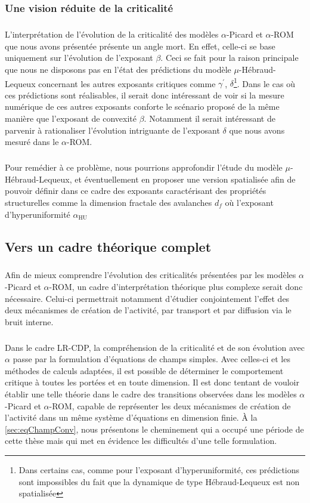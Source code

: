 \subsubsection{Une vision réduite de la criticalité}

\subparagraph{}L'interprétation de l'évolution de la criticalité des modèles $\alpha$-Picard et $\alpha$-ROM que nous avons présentée présente un angle mort. En effet, celle-ci se base uniquement sur l'évolution de l'exposant $\beta$. Ceci se fait pour la raison principale que nous ne disposons pas en l'état des prédictions du modèle $\mu$-Hébraud-Lequeux concernant les autres exposants critiques comme $\gamma^\prime$, $\delta$\footnote{Dans certains cas, comme pour l'exposant d'hyperuniformité, ces prédictions sont impossibles du fait que la dynamique de type Hébraud-Lequeux est non spatialisée}. Dans le cas où ces prédictions sont réalisables, il serait donc intéressant de voir si la mesure numérique de ces autres exposants conforte le scénario proposé de la même manière que l'exposant de convexité $\beta$. Notamment il serait intéressant de parvenir à rationaliser l'évolution intriguante de l'exposant $\delta$ que nous avons mesuré dans le $\alpha$-ROM.

\subparagraph{}Pour remédier à ce problème, nous pourrions approfondir l'étude du modèle $\mu$-Hébraud-Lequeux, et éventuellement en proposer une version spatialisée afin de pouvoir définir dans ce cadre des exposants caractérisant des propriétés structurelles comme la dimension fractale des avalanches $d_f$ où l'exposant d'hyperuniformité $\alpha_\text{HU}$

\subsection{Vers un cadre théorique complet}

\subparagraph{}Afin de mieux comprendre l'évolution des criticalités présentées par les modèles $\alpha$-Picard et $\alpha$-ROM, un cadre d'interprétation théorique plus complexe serait donc nécessaire. Celui-ci permettrait notamment d'étudier conjointement l'effet des deux mécanismes de création de l'activité, par transport et par diffusion via le bruit interne. 

\subparagraph{}Dans le cadre LR-CDP, la compréhension de la criticalité et de son évolution avec $\alpha$ passe par la formulation d'équations de champs simples. Avec celles-ci et les méthodes de calculs adaptées, il est possible de déterminer le comportement critique à toutes les portées et en toute dimension. Il est donc tentant de vouloir établir une telle théorie dans le cadre des transitions observées dans les modèles $\alpha$-Picard et $\alpha$-ROM, capable de représenter les deux mécanismes de création de l'activité dans un même système d'équations en dimension finie. \`A la \autoref{sec:eqChampConv}, nous présentons le cheminement qui a occupé une période de cette thèse mais qui met en évidence les difficultés d'une telle formulation.

